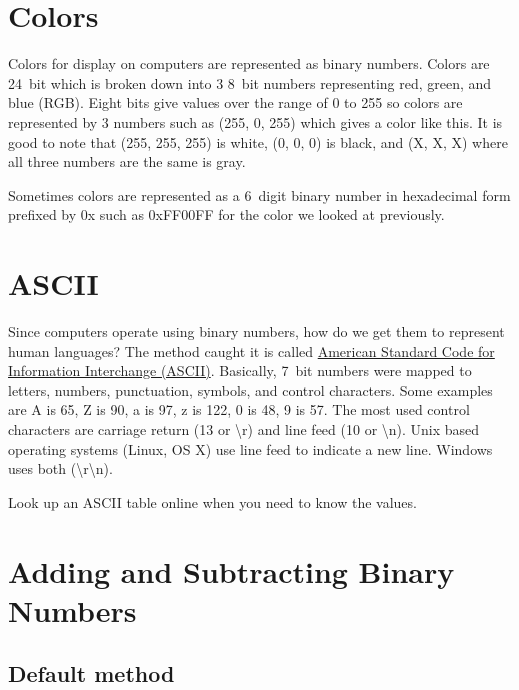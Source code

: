 \section{Colors}
Colors for display on computers are represented as binary numbers. Colors are 24~bit which is broken
down into 3 8~bit numbers representing red, green, and blue (RGB). Eight bits give values over the 
range of 0 to 255 so colors are represented by 3 numbers such as (255, 0, 255) which gives a 
\textcolor[RGB]{255, 0, 255}{color like this}. It is good to note that (255, 255, 255) is white,
(0, 0, 0) is black, and (X, X, X) where all three numbers are the same is gray.

Sometimes colors are represented as a 6~digit binary number in hexadecimal form prefixed by 0x such 
as 0xFF00FF for the color we looked at previously. 

\section{ASCII}
Since computers operate using binary numbers, how do we get them to represent human languages? The method 
caught it is called \href{https://en.wikipedia.org/wiki/ASCII}{American Standard Code for Information Interchange (ASCII)}. Basically, 7~bit numbers
were mapped to letters, numbers, punctuation, symbols, and control characters. Some examples are A is 65, Z 
is 90, a is 97, z is 122, 0 is 48, 9 is 57. The most used control characters are carriage return (13 or \textbackslash r) and 
line feed (10 or \textbackslash n). Unix based operating systems (Linux, OS X) use line feed to indicate a new line. Windows
uses both (\textbackslash r\textbackslash n).

Look up an ASCII table online when you need to know the values.

\section{Adding and Subtracting Binary Numbers}
\subsection{Default method}

